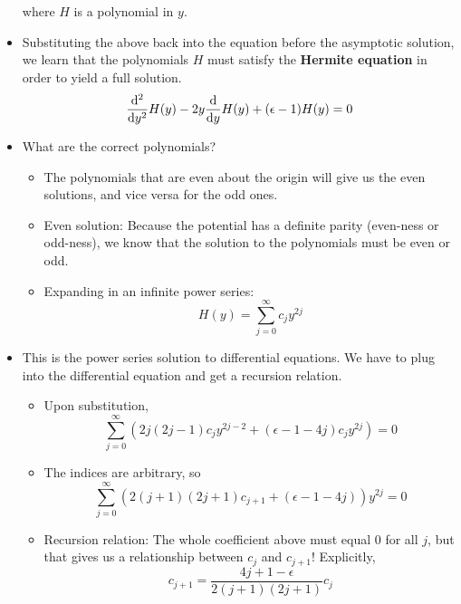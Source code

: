 \documentclass[../notes.tex]{subfiles}
\begin{document}
\begin{itemize}
\begin{equation*}
    \end{equation*}
    where $H$ is a polynomial in $y$.
    \item Substituting the above back into the equation before the asymptotic solution, we learn that the polynomials $H$ must satisfy the \textbf{Hermite equation} in order to yield a full solution.
    \begin{equation*}
        \dv[2]{y}H(y)-2y\dv{y}H(y)+(\epsilon-1)H(y) = 0
    \end{equation*}
    \item What are the correct polynomials?
    \begin{itemize}
        \item The polynomials that are even about the origin will give us the even solutions, and vice versa for the odd ones.
        \item Even solution: Because the potential has a definite parity (even-ness or odd-ness), we know that the solution to the polynomials must be even or odd.
        \item Expanding in an infinite power series:
        \begin{equation*}
            H(y) = \sum_{j=0}^\infty c_jy^{2j}
        \end{equation*}
    \end{itemize}
    \item This is the power series solution to differential equations. We have to plug into the differential equation and get a recursion relation.
    \begin{itemize}
        \item Upon substitution,
        \begin{equation*}
            \sum_{j=0}^\infty\left( 2j(2j-1)c_jy^{2j-2}+(\epsilon-1-4j)c_jy^{2j} \right) = 0
        \end{equation*}
        \item The indices are arbitrary, so
        \begin{equation*}
            \sum_{j=0}^\infty(2(j+1)(2j+1)c_{j+1}+(\epsilon-1-4j))y^{2j} = 0
        \end{equation*}
        \item Recursion relation: The whole coefficient above must equal 0 for all $j$, but that gives us a relationship between $c_j$ and $c_{j+1}$! Explicitly,
        \begin{equation*}
            c_{j+1} = \frac{4j+1-\epsilon}{2(j+1)(2j+1)}c_j
        \end{equation*}
    \end{itemize}

\end{itemize}
\end{document}
